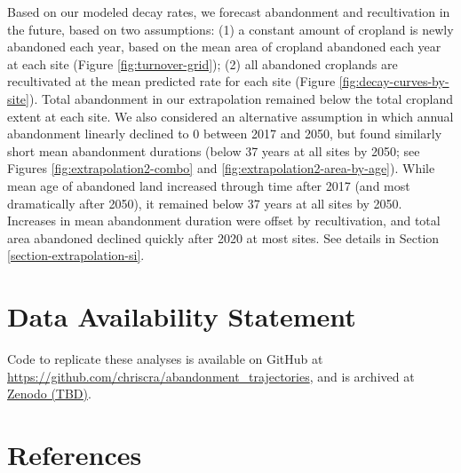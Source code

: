 \documentclass[9pt,twocolumn,twoside,lineno]{pnas-new}
\begin{document}
Based on our modeled decay rates, we forecast abandonment and recultivation in the future, based on two assumptions: (1) a constant amount of cropland is newly abandoned each year, based on the mean area of cropland abandoned each year at each site (Figure \ref{fig:turnover-grid}); (2) all abandoned croplands are recultivated at the mean predicted rate for each site (Figure \ref{fig:decay-curves-by-site}).
Total abandonment in our extrapolation remained below the total cropland extent at each site.
We also considered an alternative assumption in which annual abandonment linearly declined to 0 between 2017 and 2050, but found similarly short mean abandonment durations (below 37 years at all sites by 2050; see Figures \ref{fig:extrapolation2-combo} and \ref{fig:extrapolation2-area-by-age}).
While mean age of abandoned land increased through time after 2017 (and most dramatically after 2050), it remained below 37 years at all sites by 2050.
Increases in mean abandonment duration were offset by recultivation, and total area abandoned declined quickly after 2020 at most sites.
See details in Section \ref{section-extrapolation-si}.

\hypertarget{data-availability-statement}{%
\section{Data Availability Statement}\label{data-availability-statement}}

Code to replicate these analyses is available on GitHub at \url{https://github.com/chriscra/abandonment_trajectories}, and is archived at \href{https://doi.org/}{Zenodo (TBD)}.

\showacknow

\newpage

\hypertarget{references}{%
\section{References}\label{references}}
\end{document}
